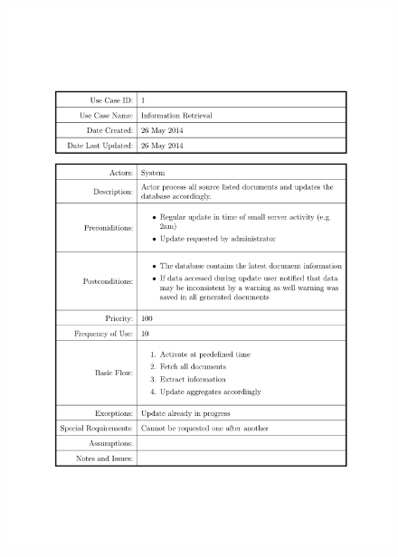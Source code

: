 \documentclass[a4paper]{tufte-book}
\begin{document}
\begin{figure}[h] \includegraphics[width=\linewidth]{Requirements/UseCases/001_IR.pdf}\end{figure}
\end{document}
